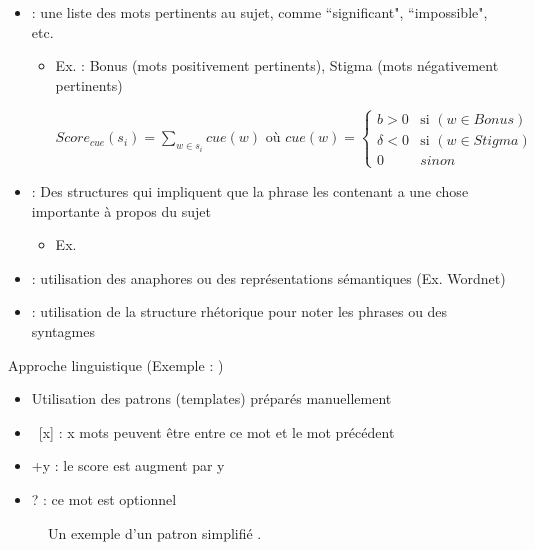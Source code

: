 \documentclass{KodeBook}
\begin{document}
\begin{itemize}
	\item {} : une liste des mots pertinents au sujet, comme ``significant", ``impossible", etc.
	\begin{itemize}
		\item Ex. \cite{69-edmundson} : Bonus (mots positivement pertinents), Stigma (mots négativement pertinents)
		
		$Score_{cue}(s_i) = \sum_{w \in s_i}{cue(w)}
		\text{ où }
		cue(w) = \left\lbrace 
		\begin{array}{ll}
		b > 0 & \text{si } (w \in Bonus) \\
		\delta < 0 & \text{si } (w \in Stigma) \\
		0 & sinon 
		\end{array} 
		\right. $
	\end{itemize}
	\item {} : Des structures qui impliquent que la phrase les contenant a une chose importante à propos du sujet
	\begin{itemize}
		\item Ex. 
	\end{itemize}
	\item {} : utilisation des anaphores ou des représentations sémantiques (Ex. Wordnet)
	\item {} : utilisation de la structure rhétorique pour noter les phrases ou des syntagmes
\end{itemize}

Approche linguistique (Exemple : \cite{81-paice})

\begin{itemize}
	\item Utilisation des patrons (templates) préparés manuellement
	\item\ [x] : x mots peuvent être entre ce mot et le mot précédent
	\item +y : le score est augment par y
	\item ? : ce mot est optionnel
\end{itemize}

\begin{figure}[!ht]
	\begin{center}
		\caption{Un exemple d'un patron simplifié \cite{81-paice}.}
		\label{fig:paice-template}
	\end{center}
\end{figure}
\end{document}
